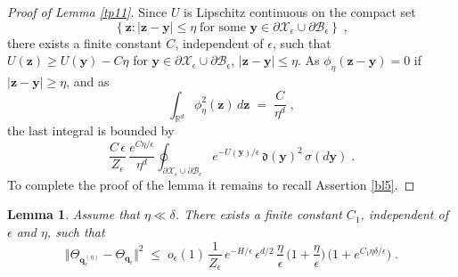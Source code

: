 \documentclass[reqno]{amsart}
\newtheorem{lemma}[theorem]{Lemma}
\newcounter{as}[section]
\newcommand{\mc}[1]{{\mathcal #1}}
\newcommand{\mf}[1]{{\mathfrak #1}}
\newcommand{\bb}[1]{{\mathbb #1}}
\newcommand{\bs}[1]{{\boldsymbol #1}}
\newcommand{\<}{\langle}
\renewcommand{\>}{\rangle}
\begin{document}
\begin{proof}[Proof of Lemma \ref{tp11}]
Since $U$ is Lipschitz continuous on the compact set
\begin{equation*}
\left\{ \bs{z}:|\bs{z}-\bs{y}|\le\eta\;\mbox{for some }
\bs{y}\in\partial\mc{X}_{\epsilon}\cup\partial\mc{B}_{\epsilon}\right\}
\;,
\end{equation*}
there exists a finite constant $C$, independent of $\epsilon$, such
that $U(\bs{z}) \ge U(\bs{y}) - C\eta$ for $\bs y
\in \partial\mc{X}_{\epsilon} \cup \partial \mc{B}_{\epsilon}$,
$|\bs{z}-\bs{y}| \le \eta$. As $\phi_{\eta}(\bs{z}-\bs{y})=0$ if
$|\bs{z}-\bs{y}|\ge\eta$, and as
\begin{equation*}
\int_{\bb{R}^{d}}\phi_{\eta}^{2}(\bs{z})\,
d\bs{z}\;=\;\frac{C}{\eta^{d}}\;,
\end{equation*}
the last integral is bounded by
\begin{equation*}
\frac{C\, \epsilon}{Z_{\epsilon}}\,
\frac{e^{C\eta/\epsilon}}{\eta^{d}}
\oint_{\partial\mc{X}_{\epsilon}\cup\partial\mc{B}_{\epsilon}}
e^{-U(\bs{y})/\epsilon} \, \mf{d}(\bs{y})^{2}\, \sigma(d\bs{y})\;.
\end{equation*}
To complete the proof of the lemma it remains to recall Assertion
\ref{bl5}.
\end{proof}

\begin{lemma}
\label{tp12}
Assume that $\eta\ll \delta$.  There exists a finite constant $C_{1}$,
independent of $\epsilon$ and $\eta$, such that
\begin{equation*}
\big\Vert \Theta_{\bs{q}_{\epsilon}^{(\eta)}}
-\Theta_{\bs{q}_{\epsilon}}\big\Vert ^{2}
\;\le\; o_{\epsilon}(1) \, \frac 1{Z_{\epsilon}} \,
e^{- H/\epsilon}\, \epsilon^{d/2} \, \frac{\eta}{\epsilon} \,
\Big( 1 + \frac{\eta}{\epsilon} \Big) \,
\Big( 1+ e^{C_1\eta\delta/\epsilon}\Big)\;.
\end{equation*}
\end{lemma}
\end{document}
